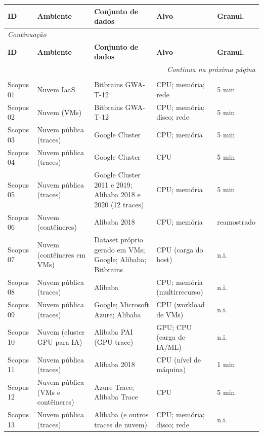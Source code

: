 {\footnotesize
\setlength{\tabcolsep}{3pt}
\renewcommand{\arraystretch}{1.15}
\begin{longtable}{p{1.3cm}p{3.2cm}p{5.0cm}p{3.5cm}p{1.8cm}}
\toprule
\textbf{ID} & \textbf{Ambiente} & \textbf{Conjunto de dados} & \textbf{Alvo} & \textbf{Granul.} \\
\midrule
\endfirsthead
\multicolumn{5}{l}{\textit{Continuação}}\\
\toprule
\textbf{ID} & \textbf{Ambiente} & \textbf{Conjunto de dados} & \textbf{Alvo} & \textbf{Granul.} \\
\midrule
\endhead
\midrule
\multicolumn{5}{r}{\textit{Continua na próxima página}}\\
\endfoot
\bottomrule
\multicolumn{5}{l}{Fonte: Elaborado pelo autor (2026).}\\
\endlastfoot
Scopus 01 & Nuvem IaaS & Bitbrains GWA-T-12 & CPU; memória; rede & 5 min \\
Scopus 02 & Nuvem (VMs) & Bitbrains GWA-T-12 & CPU; memória; disco; rede & 5 min \\
Scopus 03 & Nuvem pública (traces) & Google Cluster & CPU; memória & 5 min \\
Scopus 04 & Nuvem pública (traces) & Google Cluster & CPU & 5 min \\
Scopus 05 & Nuvem pública (traces) & Google Cluster 2011 e 2019; Alibaba 2018 e 2020 (12 traces) & CPU; memória & 5 min \\
Scopus 06 & Nuvem (contêineres) & Alibaba 2018 & CPU; memória & reamostrado \\
Scopus 07 & Nuvem (contêineres em VMs) & Dataset próprio gerado em VMs; Google; Alibaba; Bitbrains & CPU (carga do host) & n.i. \\
Scopus 08 & Nuvem pública (traces) & Alibaba & CPU; memória (multirrecurso) & n.i. \\
Scopus 09 & Nuvem pública (traces) & Google; Microsoft Azure; Alibaba & CPU (workload de VMs) & n.i. \\
Scopus 10 & Nuvem (cluster GPU para IA) & Alibaba PAI (GPU trace) & GPU; CPU (carga de IA/ML) & n.i. \\
Scopus 11 & Nuvem pública (traces) & Alibaba 2018 & CPU (nível de máquina) & 1 min \\
Scopus 12 & Nuvem pública (VMs e contêineres) & Azure Trace; Alibaba Trace & CPU & 5 min \\
Scopus 13 & Nuvem pública (traces) & Alibaba (e outros traces de nuvem) & CPU; memória; disco; rede & n.i. \\

\end{longtable}}
